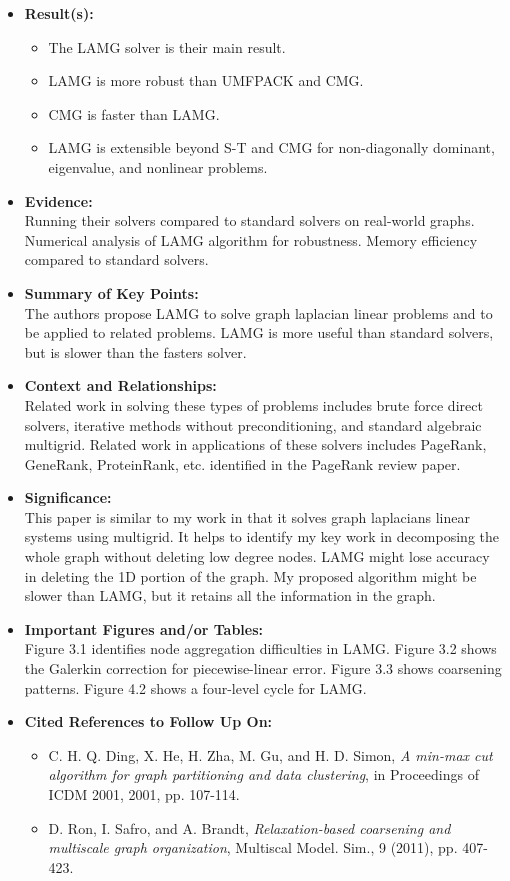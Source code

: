 \documentclass{article}
\begin{document}
\begin{itemize}
\item{\textbf{Result(s):}}
\\
\begin{itemize}
\item
The LAMG solver is their main result.
\item
LAMG is more robust than UMFPACK and CMG.
\item
CMG is faster than LAMG.
\item
LAMG is extensible beyond S-T and CMG for non-diagonally dominant, eigenvalue, and nonlinear problems.
\end{itemize}
\item{\textbf{Evidence:}}
\\
Running their solvers compared to standard solvers on real-world graphs. Numerical analysis of LAMG algorithm for robustness. Memory efficiency compared to standard solvers.

\item{\textbf{Summary of Key Points:}}
\\
The authors propose LAMG to solve graph laplacian linear problems and to be applied to related problems. LAMG is more useful than standard solvers, but is slower than the fasters solver.
\item{\textbf{Context and Relationships:}}
\\
Related work in solving these types of problems includes brute force direct solvers, iterative methods without preconditioning, and standard algebraic multigrid. Related work in applications of these solvers includes PageRank, GeneRank, ProteinRank, etc. identified in the PageRank review paper.

\item{\textbf{Significance:}}
\\
This paper is similar to my work in that it solves graph laplacians linear systems using multigrid. It helps to identify my key work in decomposing the whole graph without deleting low degree nodes. LAMG might lose accuracy in deleting the 1D portion of the graph. My proposed algorithm might be slower than LAMG, but it retains all the information in the graph. 

\item{\textbf{Important Figures and/or Tables:}}
\\
Figure 3.1 identifies node aggregation difficulties in LAMG. Figure 3.2 shows the Galerkin correction for piecewise-linear error.  Figure 3.3 shows coarsening patterns. Figure 4.2 shows a four-level cycle for LAMG.

\item{\textbf{Cited References to Follow Up On:}}
\\
\begin{itemize}
\item
C. H. Q. Ding, X. He, H. Zha, M. Gu, and H. D. Simon, \textit{A min-max cut algorithm for graph partitioning and data clustering}, in Proceedings of ICDM 2001, 2001, pp. 107-114.
\item
D. Ron, I. Safro, and A. Brandt, \textit{Relaxation-based coarsening and multiscale graph organization}, Multiscal Model. Sim., 9 (2011), pp. 407-423.

\end{itemize}
\end{itemize}
\end{document}
